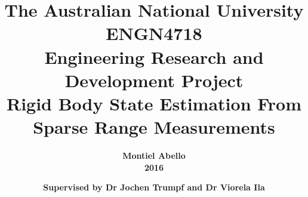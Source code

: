 \documentclass[oneside,openany,11pt]{book}
\begin{document}
\begin{titlepage}
\title{
	\normalsize
		\textbf{The Australian National University}\\
		\textbf{ENGN4718}\\
	 	\textbf{Engineering Research and Development Project}\\[2cm]
	\LARGE
		\textbf{Rigid Body State Estimation From Sparse Range Measurements}\\[2cm]}
\author{
	\textbf{Montiel Abello}\\
	\textbf{2016}}
\date{
	\textbf{Supervised by Dr Jochen Trumpf and Dr Viorela Ila}}
\maketitle
\end{titlepage}
\restoregeometry

\frontmatter


\tableofcontents
%
\listoffigures


\mainmatter

%




 




%
\end{document}
